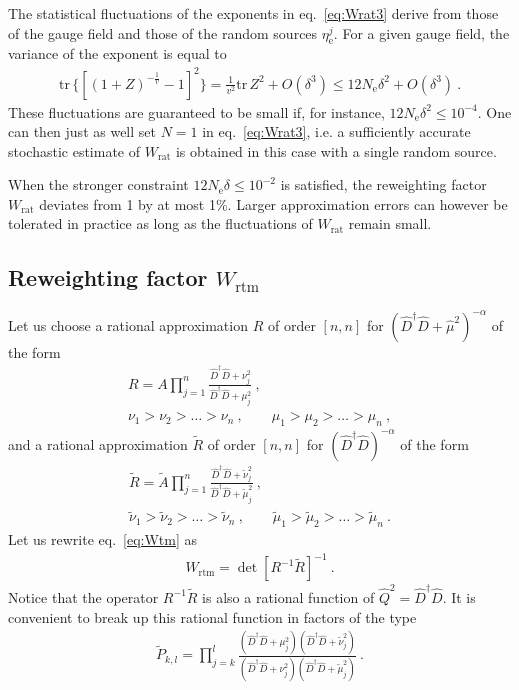 \documentclass[11pt,fleqn]{article}
\newcommand{\tr}{\mathrm{tr}\,}
\newcommand{\Rmu}{R}
\newcommand{\R}{\tilde{R}}
\begin{document}
The statistical fluctuations of the exponents in eq.~\eqref{eq:Wrat3} derive from those of the gauge field and those of the random sources $\eta^j_\text{e}$. For a given gauge field, the variance of the exponent is equal to
\begin{gather}
   \tr \{ [ (1 + Z)^{-\frac{1}{v}} - 1 ]^2 \}
   =
   \frac{1}{v^2} \tr Z^2 + O(\delta^3)
   \le
   12 N_\text{e} \delta^2 + O(\delta^3) \ .
\end{gather}
These fluctuations are guaranteed to be small if, for instance, $12 N_\text{e} \delta^2 \le 10^{−4}$. One can then just as well set $N = 1$ in eq.~\eqref{eq:Wrat3}, i.e. a sufficiently accurate stochastic estimate of $W_\text{rat}$ is obtained in this case with a single random source.

When the stronger constraint $12 N_\text{e} \delta \le 10^{−2}$ is satisfied, the reweighting factor $W_\text{rat}$ deviates from 1 by at most 1\%. Larger approximation errors can however be tolerated in practice as long as the fluctuations of $W_\text{rat}$ remain small.



\subsection{Reweighting factor $W_\text{rtm}$}

Let us choose a rational approximation $\Rmu$ of order $[n,n]$ for $(\hat{D}^\dag \hat{D} + \hat{\mu}^2)^{-\alpha}$ of the form
\begin{gather}
   \Rmu =
   A \prod_{j=1}^n \frac{\hat{D}^\dag \hat{D} + \nu_j^2}{\hat{D}^\dag \hat{D} + \mu_j^2}
   \ , \\
   \nu_1 > \nu_2 > \dots > \nu_n \ , \qquad
   \mu_1 > \mu_2 > \dots > \mu_n \ ,
\end{gather}
and a rational approximation $\R$ of order $[n,n]$ for $(\hat{D}^\dag \hat{D})^{-\alpha}$ of the form
\begin{gather}
   \R =
   \tilde{A} \prod_{j=1}^n \frac{\hat{D}^\dag \hat{D} + \tilde{\nu}_j^2}{\hat{D}^\dag \hat{D} + \tilde{\mu}_j^2}
   \ , \\
   \tilde{\nu}_1 > \tilde{\nu}_2 > \dots > \tilde{\nu}_n \ , \qquad
   \tilde{\mu}_1 > \tilde{\mu}_2 > \dots > \tilde{\mu}_n \ .
\end{gather}
Let us rewrite eq.~\eqref{eq:Wtm} as
\begin{gather}
   W_\text{rtm} = \det [ \Rmu^{-1} \R ]^{-1} \ .
\end{gather}
Notice that the operator $\Rmu^{-1} \R$ is also a rational function of $\hat{Q}^2=\hat{D}^\dag \hat{D}$. It is convenient to break up this rational function in factors of the type
\begin{gather}
   \tilde{P}_{k,l} = \prod_{j=k}^l \frac{(\hat{D}^\dag \hat{D} + \mu_j^2)(\hat{D}^\dag \hat{D} + \tilde{\nu}_j^2)}{(\hat{D}^\dag \hat{D} + \nu_j^2)(\hat{D}^\dag \hat{D} + \tilde{\mu}_j^2)} \ .
\end{gather}
\end{document}
